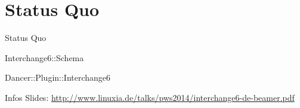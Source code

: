 \section{Status Quo}
\begin{frame}{Status Quo}
 \item Interchange6::Schema
  \item Dancer::Plugin::Interchange6
\end{frame}

\begin{frame}{Infos}
Slides:
\url{http://www.linuxia.de/talks/pws2014/interchange6-de-beamer.pdf}
\end{frame}



